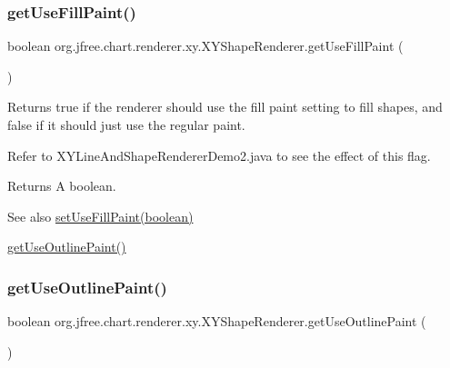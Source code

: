 \subsubsection{\texorpdfstring{get\+Use\+Fill\+Paint()}{getUseFillPaint()}}
{\footnotesize\ttfamily boolean org.\+jfree.\+chart.\+renderer.\+xy.\+X\+Y\+Shape\+Renderer.\+get\+Use\+Fill\+Paint (\begin{DoxyParamCaption}{ }\end{DoxyParamCaption})}

Returns {\ttfamily true} if the renderer should use the fill paint setting to fill shapes, and {\ttfamily false} if it should just use the regular paint. 

Refer to {\ttfamily X\+Y\+Line\+And\+Shape\+Renderer\+Demo2.\+java} to see the effect of this flag.

\begin{DoxyReturn}{Returns}
A boolean.
\end{DoxyReturn}
\begin{DoxySeeAlso}{See also}
\mbox{\hyperlink{classorg_1_1jfree_1_1chart_1_1renderer_1_1xy_1_1_x_y_shape_renderer_ac667b765f06546dd66014cb19de5c73a}{set\+Use\+Fill\+Paint(boolean)}} 

\mbox{\hyperlink{classorg_1_1jfree_1_1chart_1_1renderer_1_1xy_1_1_x_y_shape_renderer_ac0eba297f026e0ee631ae48054e0f103}{get\+Use\+Outline\+Paint()}} 
\end{DoxySeeAlso}
\mbox{\label{classorg_1_1jfree_1_1chart_1_1renderer_1_1xy_1_1_x_y_shape_renderer_ac0eba297f026e0ee631ae48054e0f103}} 
\subsubsection{\texorpdfstring{get\+Use\+Outline\+Paint()}{getUseOutlinePaint()}}
{\footnotesize\ttfamily boolean org.\+jfree.\+chart.\+renderer.\+xy.\+X\+Y\+Shape\+Renderer.\+get\+Use\+Outline\+Paint (\begin{DoxyParamCaption}{ }\end{DoxyParamCaption})}

